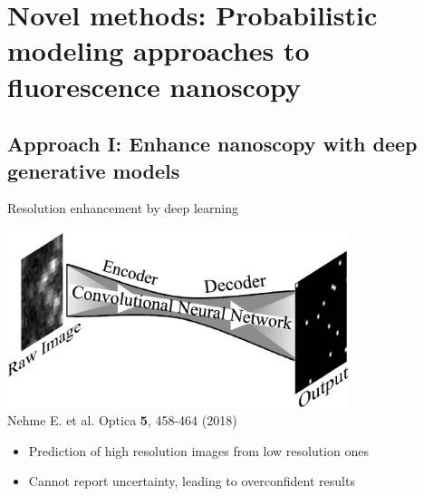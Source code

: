 \documentclass{beamer}					%
\begin{document}



\section{Novel methods: Probabilistic modeling approaches to fluorescence nanoscopy}


\subsection{Approach I: Enhance nanoscopy with deep generative models}

\begin{frame}{Resolution enhancement by deep learning}
\begin{center}
\includegraphics[width=10cm]{../../dissertation/dissertation/media/deep-storm.jpeg}
\\Nehme E. et al. Optica \textbf{5}, 458-464 (2018)
\vspace{0.5cm}
\begin{itemize}
\item Prediction of high resolution images from low resolution ones
\item Cannot report uncertainty, leading to overconfident results
\end{itemize}
\end{center}
\end{frame}
\end{document}
